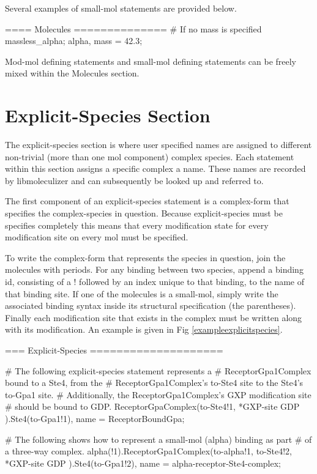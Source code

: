 Several examples of small-mol statements are provided below.  
\begin{ExampleMZR}
  ==== Molecules ==============
     # If no mass is specified
     massless_alpha; 
     alpha, mass = 42.3;

\end{ExampleMZR}

Mod-mol defining statements and small-mol defining statements can be
freely mixed within the Molecules section.

\section{Explicit-Species Section}
The explicit-species section is where user specified names are
assigned to different non-trivial (more than one mol component)
complex species.  Each statement within this section assigns a
specific complex a name.  These names are recorded by libmoleculizer
and can subsequently be looked up and referred to.

The first component of an explicit-species statement is a complex-form
that specifies the complex-species in question.  Because
explicit-species must be specifies completely this means that every
modification state for every modification site on every mol must be
specified.  

To write the complex-form that represents the species in question,
join the molecules with periods.  For any binding between two species,
append a binding id, consisting of a ! followed by an index unique to
that binding, to the name of that binding site.  If one of the molecules is
a small-mol, simply write the associated binding syntax inside its
structural specification (the parentheses).  Finally each modification
site that exists in the complex must be written along with its
modification.  An example is given in Fig
\ref{exampleexplicitspecies}.

\begin{ExampleMZR}[label=exampleexplicitspecies]
=== Explicit-Species ====================

    # The following explicit-species statement represents a
    # ReceptorGpa1Complex bound to a Ste4, from the
    # ReceptorGpa1Complex's to-Ste4 site to the Ste4's to-Gpa1 site.
    # Additionally, the ReceptorGpa1Complex's GXP modification site
    # should be bound to GDP.
    ReceptorGpaComplex(to-Ste4!1, *GXP-site { GDP } ).Ste4(to-Gpa1!1), 
        name = ReceptorBoundGpa;

    # The following shows how to represent a small-mol (alpha) binding as part
    # of a three-way complex.
    alpha(!1).ReceptorGpa1Complex(to-alpha!1, to-Ste4!2, *GXP-site {GDP} ).Ste4(to-Gpa1!2),
        name = alpha-receptor-Ste4-complex;
\end{ExampleMZR}


